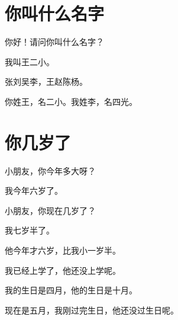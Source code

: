 \documentclass[12pt,UTF-8,openany]{ctexbook}
\begin{document}
\chapter{你叫什么名字}

\begin{large}
    
    你好！请问你叫什么名字？
    
    我叫王二小。
    
    张刘吴李，王赵陈杨。
    
    你姓王，名二小。我姓李，名四光。
    
\end{large}


\clearpage

\begin{center}
    
    
\end{center}


\hanzibox{}\hanzibox{}\hanzibox{}\hanzibox{}\hspace{1em}\hanzibox{}\hanzibox{}\hanzibox{}\hanzibox{}

\hanzibox{}\hanzibox{}\hanzibox{}\hanzibox{}\hspace{1em}\hanzibox{}\hanzibox{}\hanzibox{}\hanzibox{}

\hanzibox{}\hanzibox{}\hanzibox{}\hanzibox{}\hspace{1em}




\chapter{你几岁了}

\begin{large}
    
    小朋友，你今年多大呀？
    
    我今年六岁了。
    
    小朋友，你现在几岁了？
    
    我七岁半了。
    
    他今年才六岁，比我小一岁半。
    
    我已经上学了，他还没上学呢。
    
    我的生日是四月，他的生日是十月。
    
    现在是五月，我刚过完生日，他还没过生日呢。
    
\end{large}
\end{document}

